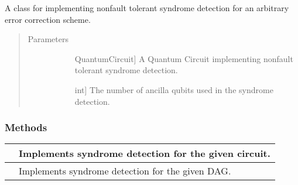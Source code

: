 \documentclass[letterpaper,10pt,english]{sphinxmanual}
\begin{document}
\begin{fulllineitems}
\begin{fulllineitems}
\begin{quote}
\begin{description}
\begin{description}
\end{description}

\end{description}\end{quote}

\end{fulllineitems}


\end{fulllineitems}


\begin{fulllineitems}
\label{\detokenize{Base:BaseFaultTolerance.SyndromeDetector}}
A class for implementing non\sphinxhyphen{}fault tolerant syndrome detection for an arbitrary error correction scheme.
\begin{quote}\begin{description}
\item[{Parameters}] \leavevmode\begin{description}
\item[{}] \leavevmode{[}QuantumCircuit{]}
A Quantum Circuit implementing non\sphinxhyphen{}fault tolerant syndrome detection.

\item[{}] \leavevmode{[}int{]}
The number of ancilla qubits used in the syndrome detection.

\end{description}

\end{description}\end{quote}
\subsubsection*{Methods}


\begin{savenotes}\sphinxattablestart
\centering
\begin{tabulary}{\linewidth}[t]{|T|T|}
\hline

&
Implements syndrome detection for the given circuit.
\\
\hline
{}
&
Implements syndrome detection for the given DAG.
\\
\hline
\end{tabulary}
\par
\sphinxattableend\end{savenotes}


\end{fulllineitems}
\end{document}
